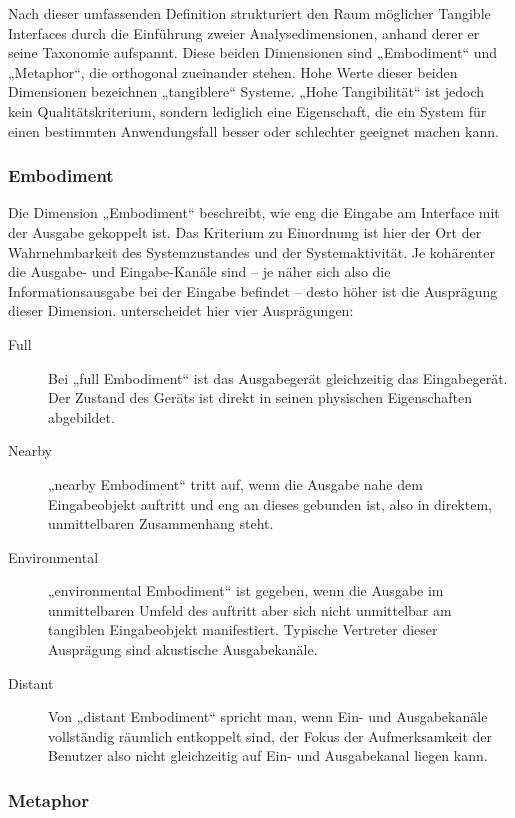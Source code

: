Nach dieser umfassenden Definition strukturiert \citeauthor{Fishkin04} den Raum möglicher Tangible Interfaces durch die Einführung zweier Analysedimensionen, anhand derer er seine  Taxonomie aufspannt. Diese beiden Dimensionen sind „Embodiment“ und „Metaphor“, die orthogonal zueinander stehen. Hohe Werte dieser beiden Dimensionen bezeichnen „tangiblere“ Systeme. „Hohe Tangibilität“ ist jedoch kein Qualitätskriterium, sondern lediglich eine Eigenschaft, die ein System für einen bestimmten Anwendungsfall besser oder schlechter geeignet machen kann.

\subsubsection{Embodiment}
Die Dimension „Embodiment“ beschreibt, wie eng die Eingabe am Interface mit der Ausgabe gekoppelt ist. Das Kriterium zu Einordnung ist hier der Ort der Wahrnehmbarkeit des Systemzustandes und der Systemaktivität. Je kohärenter die Ausgabe- und Eingabe-Kanäle sind -- je näher sich also die Informationsausgabe bei der Eingabe befindet -- desto höher ist die Ausprägung dieser Dimension. \citeauthor{Fishkin04} unterscheidet hier vier Ausprägungen:
\begin{description}
 \item[Full] Bei „full Embodiment“ ist das Ausgabegerät gleichzeitig das Eingabegerät. Der Zustand des Geräts ist direkt in seinen physischen Eigenschaften abgebildet.
 \item[Nearby] „nearby Embodiment“ tritt auf, wenn die Ausgabe nahe dem Eingabeobjekt auftritt und eng an dieses gebunden ist, also in direktem, unmittelbaren Zusammenhang steht. 
 \item[Environmental] „environmental Embodiment“ ist gegeben, wenn die Ausgabe im unmittelbaren Umfeld des auftritt aber sich nicht unmittelbar am tangiblen Eingabeobjekt manifestiert. Typische Vertreter dieser Ausprägung sind akustische Ausgabekanäle.
 \item[Distant] Von „distant Embodiment“ spricht man, wenn Ein- und Ausgabekanäle vollständig räumlich entkoppelt sind, der Fokus der Aufmerksamkeit der Benutzer also nicht gleichzeitig auf Ein- und Ausgabekanal liegen kann. 
\end{description}

\subsubsection{Metaphor}


